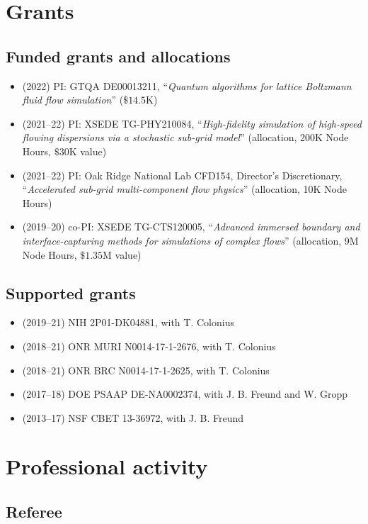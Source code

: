 \section{Grants}

\subsection{Funded grants and allocations}

\begin{itemize}
    \item (2022) PI: GTQA DE00013211, ``\textit{Quantum algorithms for lattice Boltzmann fluid flow simulation}'' ($\$14.5$K)
    \item (2021--22) PI: XSEDE TG-PHY210084, ``\textit{High-fidelity simulation of high-speed flowing dispersions via a stochastic sub-grid model}''  (allocation, 200K Node Hours, $\$30$K value)
    \item (2021--22) PI: Oak Ridge National Lab CFD154, Director's Discretionary, ``\textit{Accelerated sub-grid multi-component flow physics}'' (allocation, 10K Node Hours)
    \item (2019--20) co-PI: XSEDE TG-CTS120005, ``\textit{Advanced immersed boundary and interface-capturing methods for simulations of complex flows}'' (allocation, 9M Node Hours, $\$1.35$M value)
\end{itemize}

\subsection{Supported grants}

\begin{itemize}
    \item (2019--21) NIH 2P01-DK04881, with T. Colonius
    \item (2018--21) ONR MURI N0014-17-1-2676, with T. Colonius
    \item (2018--21) ONR BRC N0014-17-1-2625, with T. Colonius
    \item (2017--18) DOE PSAAP DE-NA0002374, with J. B. Freund and W. Gropp
    \item (2013--17) NSF CBET 13-36972, with J. B. Freund
\end{itemize}

\section{Professional activity}

\subsection{Referee}

